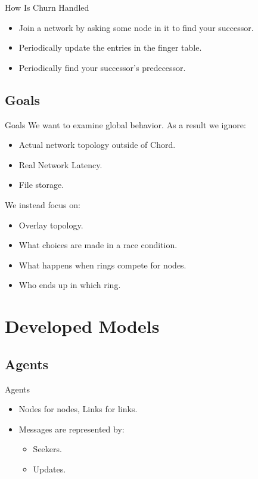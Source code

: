\documentclass{beamer}
\begin{document}
\begin{frame}{How Is Churn Handled}
	\begin{itemize}
		\item Join a network by asking some node in it to find your successor.
		\item Periodically update the entries in the finger table.
		\item Periodically find your successor's predecessor.
	\end{itemize}

\end{frame}

\subsection{Goals}

\begin{frame}{Goals}
We want to examine global behavior.  As a result we ignore:
	\begin{itemize}
		\item Actual network topology outside of Chord.
		\item Real Network Latency.
		\item File storage.
	\end{itemize}
We instead focus on:
	\begin{itemize}
		\item Overlay topology.
		\item What choices are made in a race condition.
		\item What happens when rings compete for nodes.
		\item Who ends up in which ring.
	\end{itemize}

\end{frame}



\section{Developed Models} 


\subsection{Agents}
\begin{frame}{Agents}
	\begin{itemize}
		\item Nodes for nodes, Links for links.
		\item Messages are represented by:
		\begin{itemize}
			\item Seekers.
			\item Updates.
		\end{itemize}
	\end{itemize}
\end{frame}
\end{document}
